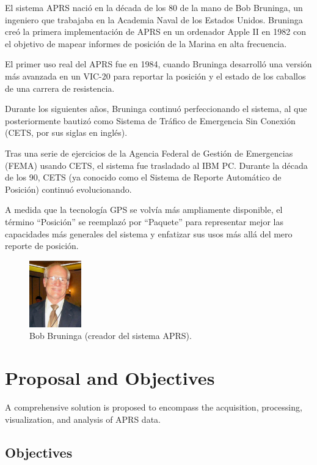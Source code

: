 El sistema APRS nació en la década de los 80 de la mano de Bob Bruninga, un ingeniero que trabajaba en la Academia Naval de los Estados Unidos. Bruninga creó la primera implementación de APRS en un ordenador Apple II en 1982 con el objetivo de mapear informes de posición de la Marina en alta frecuencia. \cite{APRSOrigins}

El primer uso real del APRS fue en 1984, cuando Bruninga desarrolló una versión más avanzada en un VIC-20 para reportar la posición y el estado de los caballos de una carrera de resistencia.

Durante los siguientes años, Bruninga continuó perfeccionando el sistema, al que posteriormente bautizó como Sistema de Tráfico de Emergencia Sin Conexión (CETS, por sus siglas en inglés).

Tras una serie de ejercicios de la Agencia Federal de Gestión de Emergencias (FEMA) usando CETS, el sistema fue trasladado al IBM PC. Durante la década de los 90, CETS (ya conocido como el Sistema de Reporte Automático de Posición) continuó evolucionando.

A medida que la tecnología GPS se volvía más ampliamente disponible, el término ``Posición'' se reemplazó por ``Paquete'' para representar mejor las capacidades más generales del sistema y enfatizar sus usos más allá del mero reporte de posición.

\begin{figure}[h]
	\centering
	\includegraphics[width=0.2\textwidth]{Imagenes/Chapter_1/bob_bruninga.png}
	\caption{Bob Bruninga (creador del sistema APRS).}
	\label{fig:bob-bruninga-es}
\end{figure}


\section{Proposal and Objectives}

A comprehensive solution is proposed to encompass the acquisition, processing, visualization, and analysis of APRS data.

\subsection{Objectives}

